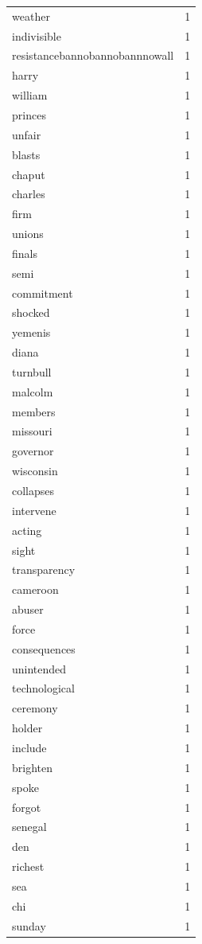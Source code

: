 \begin{tabular}{lr}
weather & 1 \\
indivisible & 1 \\
resistancebannobannobannnowall & 1 \\
harry & 1 \\
william & 1 \\
princes & 1 \\
unfair & 1 \\
blasts & 1 \\
chaput & 1 \\
charles & 1 \\
firm & 1 \\
unions & 1 \\
finals & 1 \\
semi & 1 \\
commitment & 1 \\
shocked & 1 \\
yemenis & 1 \\
diana & 1 \\
turnbull & 1 \\
malcolm & 1 \\
members & 1 \\
missouri & 1 \\
governor & 1 \\
wisconsin & 1 \\
collapses & 1 \\
intervene & 1 \\
acting & 1 \\
sight & 1 \\
transparency & 1 \\
cameroon & 1 \\
abuser & 1 \\
force & 1 \\
consequences & 1 \\
unintended & 1 \\
technological & 1 \\
ceremony & 1 \\
holder & 1 \\
include & 1 \\
brighten & 1 \\
spoke & 1 \\
forgot & 1 \\
senegal & 1 \\
den & 1 \\
richest & 1 \\
sea & 1 \\
chi & 1 \\
sunday & 1 \\

\end{tabular}
